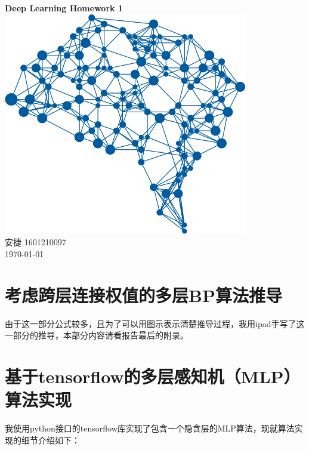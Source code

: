 \documentclass[a4paper, UTF8]{ctexrep}
\begin{document}
	\begin{titlepage}
		\centering
		\vspace{6cm}
		\LARGE{\textbf{Deep Learning Homework 1}}\\
		\vspace{4cm}
		\includegraphics[width=0.8\textwidth]{deepLearning.png}\\
		\vspace{4cm}
		\normalsize{安捷 1601210097}\\
		\normalsize{\today}
	\end{titlepage}
  \section{考虑跨层连接权值的多层BP算法推导}
    由于这一部分公式较多，且为了可以用图示表示清楚推导过程，我用ipad手写了这一部分的推导，本部分内容请看报告最后的附录。
  \section{基于tensorflow的多层感知机（MLP）算法实现}
    我使用python接口的tensorflow库实现了包含一个隐含层的MLP算法，现就算法实现的细节介绍如下：
\end{document}
